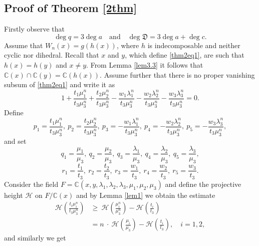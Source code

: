 \documentclass[12pt]{amsart}
\newcommand{\C}{\mbox{$\mathbb C$}}     %
\begin{document}
\subsection{Proof of Theorem \ref{2thm}}
    Firstly observe that  
    \begin{equation}\label{eqndeg}
        \deg q=3\deg a \quad \text{and} \quad \deg \mathfrak{D}=3\deg a+\deg c.
    \end{equation}
    Assume that $W_n(x)=g(h(x))$, where $h$ is indecomposable and neither cyclic nor dihedral. Recall that $x$ and $y$, which define \eqref{thm2eq1}, are such that $h(x)=h(y)$ and $x\neq y$. From Lemma \ref{lem3.3} it follows that $\C(x)\cap \C(y)=\C(h(x))$. Assume further that there is no proper vanishing subsum of \eqref{thm2eq1} and write it as 
    \begin{equation}\label{sumeq}
        1+ \frac{t_1\mu_1^n}{t_3\mu_3^n}+\frac{t_2\mu_2^n}{t_3\mu_3^n}-\frac{w_1\lambda_1^n}{t_3\mu_3^n}-\frac{w_2\lambda_2^n}{t_3\mu_3^n}-\frac{w_3\lambda_3^n}{t_3\mu_3^n}=0.
    \end{equation}
     Define
     \begin{equation*}
         p_1= \frac{t_1\mu_1^n}{t_3\mu_3^n},~p_2=\frac{t_2\mu_2^n}{t_3\mu_3^n}, ~p_3=-\frac{w_1\lambda_1^n}{t_3\mu_3^n}, ~p_4=-\frac{w_2\lambda_2^n}{t_3\mu_3^n}, ~p_5=-\frac{w_3\lambda_3^n}{t_3\mu_3^n}, 
     \end{equation*}
    and set
    \begin{equation*}
        q_1=\frac{\mu_1}{\mu_3},~ q_2=\frac{\mu_2}{\mu_3}, ~q_3=\frac{\lambda_1}{\mu_3}, ~q_4=\frac{\lambda_2}{\mu_3}, ~q_5=\frac{\lambda_3}{\mu_3},
    \end{equation*}
    \begin{equation*}
        r_1=\frac{t_1}{t_3}, ~r_2=\frac{t_2}{t_3}, ~r_3=\frac{w_1}{t_3}, ~r_4=\frac{w_2}{t_3}, ~r_5=\frac{w_3}{t_3}.
    \end{equation*}
    Consider the field $F=\C(x,y,\lambda_1,\lambda_2,\lambda_3, \mu_1,\mu_2,\mu_3)$ and define the projective height $\mathcal{H}$ on $F/\C(x)$ and by Lemma \ref{lem1} we obtain the estimate
    \begin{align*}
        \mathcal{H}\left(\frac{t_i\mu_i^n}{t_3\mu_3^n}\right)&\geq ~\mathcal{H}\left( \frac{\mu_i^{n}}{\mu_3^{n}}\right)-\mathcal{H}\left( \frac{t_i}{t_3}\right) \\&= n ~\cdot ~\mathcal{H}\left( \frac{\mu_i}{\mu_3}\right)-\mathcal{H}\left( \frac{t_i}{t_3}\right), \quad i=1,2,
    \end{align*}
    and similarly we get
\end{document}
